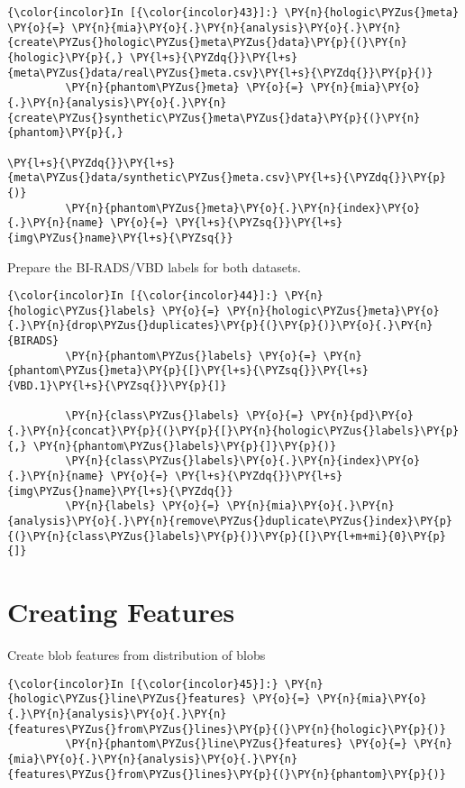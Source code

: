     \begin{Verbatim}[commandchars=\\\{\}]
{\color{incolor}In [{\color{incolor}43}]:} \PY{n}{hologic\PYZus{}meta} \PY{o}{=} \PY{n}{mia}\PY{o}{.}\PY{n}{analysis}\PY{o}{.}\PY{n}{create\PYZus{}hologic\PYZus{}meta\PYZus{}data}\PY{p}{(}\PY{n}{hologic}\PY{p}{,} \PY{l+s}{\PYZdq{}}\PY{l+s}{meta\PYZus{}data/real\PYZus{}meta.csv}\PY{l+s}{\PYZdq{}}\PY{p}{)}
         \PY{n}{phantom\PYZus{}meta} \PY{o}{=} \PY{n}{mia}\PY{o}{.}\PY{n}{analysis}\PY{o}{.}\PY{n}{create\PYZus{}synthetic\PYZus{}meta\PYZus{}data}\PY{p}{(}\PY{n}{phantom}\PY{p}{,}
                                                                \PY{l+s}{\PYZdq{}}\PY{l+s}{meta\PYZus{}data/synthetic\PYZus{}meta.csv}\PY{l+s}{\PYZdq{}}\PY{p}{)}
         \PY{n}{phantom\PYZus{}meta}\PY{o}{.}\PY{n}{index}\PY{o}{.}\PY{n}{name} \PY{o}{=} \PY{l+s}{\PYZsq{}}\PY{l+s}{img\PYZus{}name}\PY{l+s}{\PYZsq{}}
\end{Verbatim}

    Prepare the BI-RADS/VBD labels for both datasets.

    \begin{Verbatim}[commandchars=\\\{\}]
{\color{incolor}In [{\color{incolor}44}]:} \PY{n}{hologic\PYZus{}labels} \PY{o}{=} \PY{n}{hologic\PYZus{}meta}\PY{o}{.}\PY{n}{drop\PYZus{}duplicates}\PY{p}{(}\PY{p}{)}\PY{o}{.}\PY{n}{BIRADS}
         \PY{n}{phantom\PYZus{}labels} \PY{o}{=} \PY{n}{phantom\PYZus{}meta}\PY{p}{[}\PY{l+s}{\PYZsq{}}\PY{l+s}{VBD.1}\PY{l+s}{\PYZsq{}}\PY{p}{]}

         \PY{n}{class\PYZus{}labels} \PY{o}{=} \PY{n}{pd}\PY{o}{.}\PY{n}{concat}\PY{p}{(}\PY{p}{[}\PY{n}{hologic\PYZus{}labels}\PY{p}{,} \PY{n}{phantom\PYZus{}labels}\PY{p}{]}\PY{p}{)}
         \PY{n}{class\PYZus{}labels}\PY{o}{.}\PY{n}{index}\PY{o}{.}\PY{n}{name} \PY{o}{=} \PY{l+s}{\PYZdq{}}\PY{l+s}{img\PYZus{}name}\PY{l+s}{\PYZdq{}}
         \PY{n}{labels} \PY{o}{=} \PY{n}{mia}\PY{o}{.}\PY{n}{analysis}\PY{o}{.}\PY{n}{remove\PYZus{}duplicate\PYZus{}index}\PY{p}{(}\PY{n}{class\PYZus{}labels}\PY{p}{)}\PY{p}{[}\PY{l+m+mi}{0}\PY{p}{]}
\end{Verbatim}

    \section{Creating Features}\label{creating-features}

    Create blob features from distribution of blobs

    \begin{Verbatim}[commandchars=\\\{\}]
{\color{incolor}In [{\color{incolor}45}]:} \PY{n}{hologic\PYZus{}line\PYZus{}features} \PY{o}{=} \PY{n}{mia}\PY{o}{.}\PY{n}{analysis}\PY{o}{.}\PY{n}{features\PYZus{}from\PYZus{}lines}\PY{p}{(}\PY{n}{hologic}\PY{p}{)}
         \PY{n}{phantom\PYZus{}line\PYZus{}features} \PY{o}{=} \PY{n}{mia}\PY{o}{.}\PY{n}{analysis}\PY{o}{.}\PY{n}{features\PYZus{}from\PYZus{}lines}\PY{p}{(}\PY{n}{phantom}\PY{p}{)}
\end{Verbatim}

